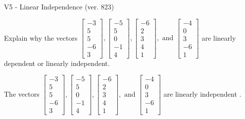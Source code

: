 \begin{exercise}
  \begin{exerciseTitle}V5 - Linear Independence (ver. 823)\end{exerciseTitle}
  \begin{exerciseStatement}
    Explain why the vectors \(\left[\begin{array}{r}
-3 \\
5 \\
5 \\
-6 \\
3
\end{array}\right] , \left[\begin{array}{r}
-5 \\
5 \\
0 \\
-1 \\
4
\end{array}\right] , \left[\begin{array}{r}
-6 \\
2 \\
3 \\
4 \\
1
\end{array}\right] , \text{ and } \left[\begin{array}{r}
-4 \\
0 \\
3 \\
-6 \\
1
\end{array}\right]\) are linearly dependent or linearly independent.	


  \end{exerciseStatement}
  \begin{exerciseAnswer}
   The vectors \(\left[\begin{array}{r}
-3 \\
5 \\
5 \\
-6 \\
3
\end{array}\right] , \left[\begin{array}{r}
-5 \\
5 \\
0 \\
-1 \\
4
\end{array}\right] , \left[\begin{array}{r}
-6 \\
2 \\
3 \\
4 \\
1
\end{array}\right] , \text{ and } \left[\begin{array}{r}
-4 \\
0 \\
3 \\
-6 \\
1
\end{array}\right]\) are 
  	 linearly independent  .
  


  \end{exerciseAnswer}
\end{exercise}